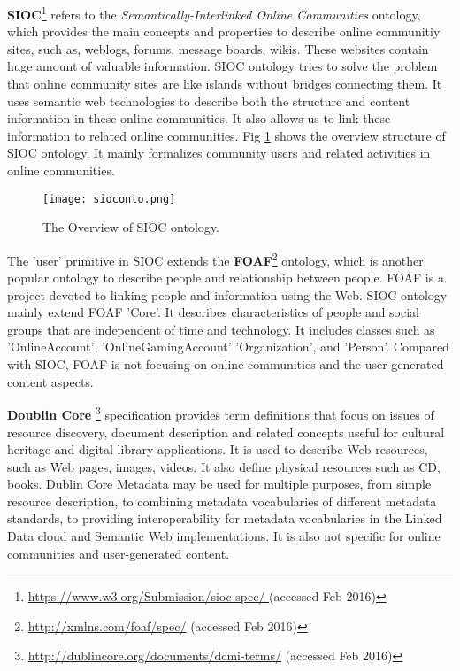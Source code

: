 \textbf{SIOC}\footnote{\url{https://www.w3.org/Submission/sioc-spec/ }(accessed Feb 2016) } refers to the \textit{Semantically-Interlinked Online Communities} ontology, which provides the main concepts and properties to describe online communitiy sites, such as, weblogs, forums, message boards, wikis. These websites contain huge amount of valuable information. SIOC ontology tries to solve the problem that online community sites are like islands without bridges connecting them. It uses semantic web technologies to describe both the structure and content information in these online communities. It also allows us to link these information to related online communities. Fig \ref{fig:siocontos} shows the overview structure of SIOC ontology. It mainly formalizes community users and related activities in online communities.
 
\begin{figure}%
\centering
\texttt{[image: sioconto.png]}  
\caption{The Overview of SIOC ontology.}
\label{fig:siocontos} 
\end{figure}


 
The 'user' primitive in SIOC extends the \textbf{FOAF}\footnote{\url{http://xmlns.com/foaf/spec/} (accessed Feb 2016) } ontology, which is another popular ontology to describe people and relationship between people. FOAF is a project devoted to linking people and information using the Web. SIOC ontology mainly extend FOAF 'Core'. It describes characteristics of people and social groups that are independent of time and technology. It includes classes such as 'OnlineAccount', 'OnlineGamingAccount' 'Organization', and 'Person'. Compared with SIOC, FOAF is not focusing on online communities and the user-generated content aspects. 
 
\textbf{Doublin Core} \footnote{\url{http://dublincore.org/documents/dcmi-terms/} (accessed Feb 2016) } specification provides term definitions that focus on issues of resource discovery, document description and related concepts useful for cultural heritage and digital library applications. It is used to describe Web resources, such as Web pages, images, videos. It also define physical resources such as CD, books. Dublin Core Metadata may be used for multiple purposes, from simple resource description, to combining metadata vocabularies of different metadata standards, to providing interoperability for metadata vocabularies in the Linked Data cloud and Semantic Web implementations. It is also not specific for online communities and user-generated content.

